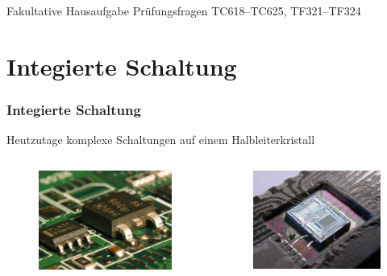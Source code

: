 \begin{frame}
  \begin{exampleblock}{Fakultative Hausaufgabe}
    Prüfungsfragen TC618--TC625, TF321--TF324
  \end{exampleblock}
\end{frame}

\section*{Integierte Schaltung}
\begin{frame}
  \frametitle{Integierte Schaltung}
  Heutzutage komplexe Schaltungen auf einem Halbleiterkristall
  \begin{columns}
    \begin{center}
      \begin{figure}
        \includegraphics[width=\textwidth,height=.6\textheight,keepaspectratio]{a06/IC.jpg}
      \end{figure}
    \end{center}
    \begin{center}
      \begin{figure}
        \includegraphics[width=\textwidth,height=.6\textheight,keepaspectratio]{a06/IC2.jpg}

\end{figure}
\end{center}
\end{columns}
\end{frame}

